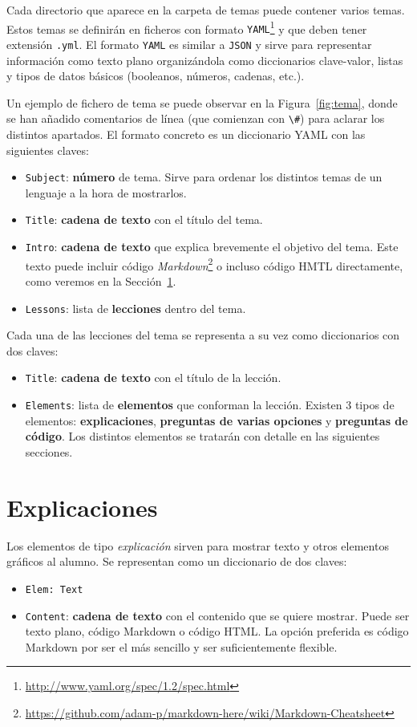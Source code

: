 \documentclass[]{article}
\newcommand{\code}[1]{{\lstinline[basicstyle=\ttfamily,mathescape]!#1!}}
\begin{document}
Cada directorio que aparece en la carpeta de temas puede contener varios temas. Estos temas se definirán en ficheros con formato \code{YAML}\footnote{\url{http://www.yaml.org/spec/1.2/spec.html}} y que deben tener extensión \code{.yml}. El formato \code{YAML} es similar a \code{JSON} y sirve para representar información como texto plano organizándola como diccionarios clave-valor, listas y tipos de datos básicos (booleanos, números, cadenas, etc.).

Un ejemplo de fichero de tema se puede observar en la Figura~\ref{fig:tema}, donde se han añadido comentarios de línea (que comienzan con \code{\#}) para aclarar los distintos apartados. El formato concreto es un diccionario YAML con las siguientes claves:
\begin{itemize}
\item \code{Subject}: \textbf{número} de tema. Sirve para ordenar los distintos temas de un lenguaje a la hora de mostrarlos.
\item \code{Title}: \textbf{cadena de texto} con el título del tema. 
\item \code{Intro}: \textbf{cadena de texto} que explica brevemente el objetivo del tema. Este texto puede incluir código \emph{Markdown}\footnote{\url{https://github.com/adam-p/markdown-here/wiki/Markdown-Cheatsheet}} o incluso código HMTL directamente, como veremos en la Sección~\ref{sec:explicaciones}.
\item \code{Lessons}: lista de \textbf{lecciones} dentro del tema.
\end{itemize}

Cada una de las lecciones del tema se representa a su vez como diccionarios con dos claves:
\begin{itemize}
\item \code{Title}: \textbf{cadena de texto} con el título de la lección.
\item \code{Elements}: lista de \textbf{elementos} que conforman la lección. Existen 3 tipos de elementos: \textbf{explicaciones}, \textbf{preguntas de varias opciones} y \textbf{preguntas de código}. Los distintos elementos se tratarán con detalle en las siguientes secciones.
\end{itemize}


\section{Explicaciones}\label{sec:explicaciones}
Los elementos de tipo \emph{explicación} sirven para mostrar texto y otros elementos gráficos al alumno. Se representan como un diccionario de dos claves:
\begin{itemize}
	 \item \code{Elem: Text}
	 \item \code{Content}: \textbf{cadena de texto} con el contenido que se quiere mostrar. Puede ser texto plano, código Markdown o código HTML. La opción preferida es código Markdown por ser el más sencillo y ser suficientemente flexible.
\end{itemize}
\end{document}
